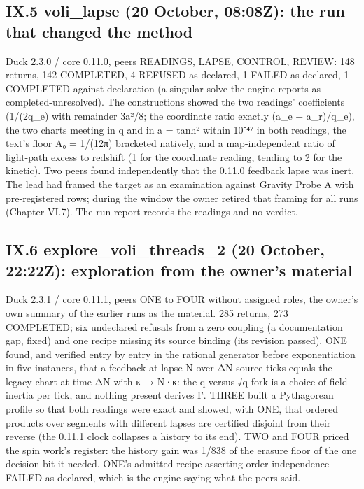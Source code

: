 \subsection{IX.5 voli\_lapse (20 October, 08:08Z): the run that changed the method}\label{ix.5-voli_lapse-20-october-0808z-the-run-that-changed-the-method}

Duck 2.3.0 / core 0.11.0, peers READINGS, LAPSE, CONTROL, REVIEW: 148 returns, 142 COMPLETED, 4 REFUSED as declared, 1 FAILED as declared,
1 COMPLETED against declaration (a singular solve the engine reports as completed-unresolved). The constructions showed the two readings'
coefficients (1/(2q\_e) with remainder 3a²/8; the coordinate ratio exactly (a\_e − a\_r)/q\_e), the two charts meeting in q and in a = tanh² within
10⁻⁴⁷ in both readings, the text's floor A₀ = 1/(12π) bracketed natively, and a map-independent ratio of light-path excess to redshift (1 for
the coordinate reading, tending to 2 for the kinetic). Two peers found independently that the 0.11.0 feedback lapse was inert. The lead had
framed the target as an examination against Gravity Probe A with pre-registered rows; during the window the owner retired that framing for all
runs (Chapter VI.7). The run report records the readings and no verdict.

\subsection{IX.6 explore\_voli\_threads\_2 (20 October, 22:22Z): exploration from the owner's material}\label{ix.6-explore_voli_threads_2-20-october-2222z-exploration-from-the-owners-material}

Duck 2.3.1 / core 0.11.1, peers ONE to FOUR without assigned roles, the owner's own summary of the earlier runs as the material. 285 returns,
273 COMPLETED; six undeclared refusals from a zero coupling (a documentation gap, fixed) and one recipe missing its source binding (its
revision passed). ONE found, and verified entry by entry in the rational generator before exponentiation in five instances, that a feedback at
lapse N over ΔN source ticks equals the legacy chart at time ΔN with κ → N·κ: the q versus √q fork is a choice of field inertia per tick, and
nothing present derives Γ. THREE built a Pythagorean profile so that both readings were exact and showed, with ONE, that ordered products over
segments with different lapses are certified disjoint from their reverse (the 0.11.1 clock collapses a history to its end). TWO and FOUR priced
the spin work's register: the history gain was 1/838 of the erasure floor of the one decision bit it needed. ONE's admitted recipe asserting
order independence FAILED as declared, which is the engine saying what the peers said.

